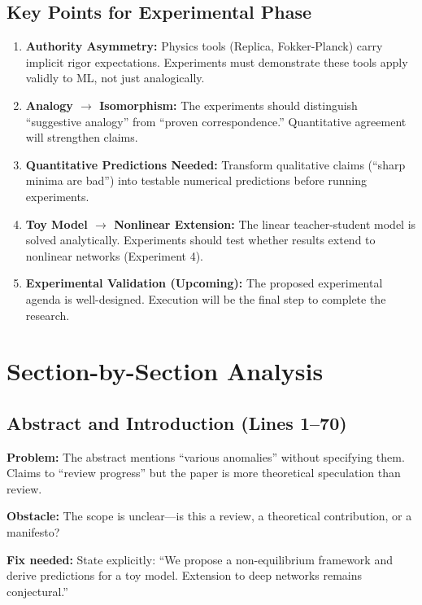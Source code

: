\documentclass[11pt]{article}
\begin{document}
\subsection{Key Points for Experimental Phase}

\begin{enumerate}[label=\textbf{P\arabic*.}]
    \item \textbf{Authority Asymmetry:} Physics tools (Replica, Fokker-Planck) carry implicit rigor expectations. Experiments must demonstrate these tools apply validly to ML, not just analogically.
    
    \item \textbf{Analogy $\to$ Isomorphism:} The experiments should distinguish ``suggestive analogy'' from ``proven correspondence.'' Quantitative agreement will strengthen claims.
    
    \item \textbf{Quantitative Predictions Needed:} Transform qualitative claims (``sharp minima are bad'') into testable numerical predictions before running experiments.
    
    \item \textbf{Toy Model $\to$ Nonlinear Extension:} The linear teacher-student model is solved analytically. Experiments should test whether results extend to nonlinear networks (Experiment 4).
    
    \item \textbf{Experimental Validation (Upcoming):} The proposed experimental agenda is well-designed. Execution will be the final step to complete the research.
\end{enumerate}

\section{Section-by-Section Analysis}

\subsection{Abstract and Introduction (Lines 1--70)}

\begin{handwavebox}
\textbf{Problem:} The abstract mentions ``various anomalies'' without specifying them. Claims to ``review progress'' but the paper is more theoretical speculation than review.

\textbf{Obstacle:} The scope is unclear---is this a review, a theoretical contribution, or a manifesto?

\textbf{Fix needed:} State explicitly: ``We propose a non-equilibrium framework and derive predictions for a toy model. Extension to deep networks remains conjectural.''
\end{handwavebox}
\end{document}
